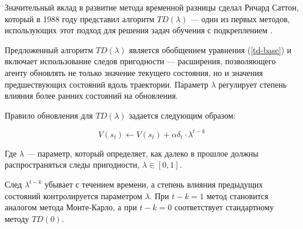 Значительный вклад в развитие метода временной разницы сделал Ричард Саттон, который в 1988 году представил алгоритм $TD(\lambda)$ — один из первых методов, использующих этот подход для решения задач обучения с подкреплением \cite{td-first-improvement}.

Предложенный алгоритм $TD(\lambda)$ является обобщением уравнения (\ref{td-base}) и включает использование следов пригодности — расширения, позволяющего агенту обновлять не только значение текущего состояния, но и значения предшествующих состояний вдоль траектории. Параметр $\lambda$ регулирует степень влияния более ранних состояний на обновления.

Правило обновления для $TD(\lambda)$ задается следующим образом:

\begin{equation}\label{td-lambda}
    V(s_t) \leftarrow V(s_t) + \alpha \delta_t \cdot \lambda^{t - k}
\end{equation}

Где $\lambda$ --- параметр, который определяет, как далеко в прошлое должны распространяться следы пригодности, $\lambda \in [0, 1]$.

След $\lambda^{t-k}$ убывает с течением времени, а степень влияния предыдущих состояний контролируется параметром $\lambda$. При $t-k = 1$ метод становится аналогом метода Монте-Карло, а при $t-k = 0$ соответствует стандартному методу $TD(0)$.
